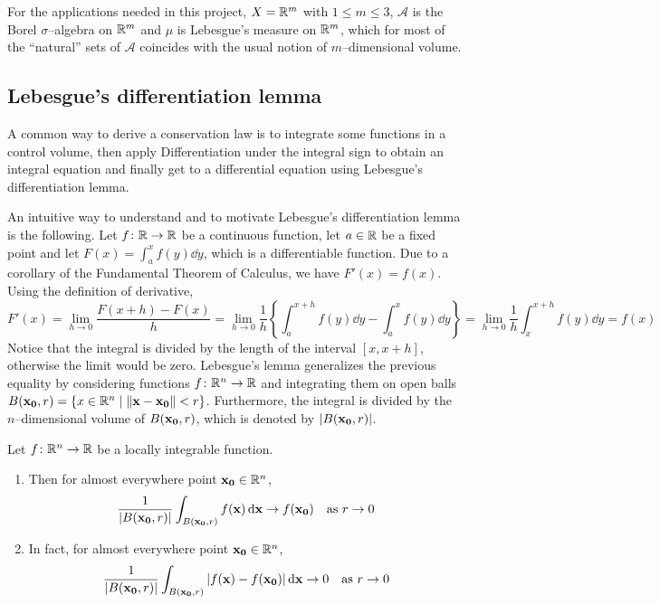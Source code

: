 For the applications needed in this project, $X = \mathbb{R}^m$ with $1 \leq m \leq 3$, $\mathcal{A}$ is the Borel $\sigma$--algebra on $\mathbb{R}^m$ and $\mu$ is Lebesgue's measure on $\mathbb{R}^m$, which for most of the ``natural'' sets of $\mathcal{A}$ coincides with the usual notion of $m$--dimensional volume.

\subsection{Lebesgue's differentiation lemma}

A common way to derive a conservation law is to integrate some functions in a control volume, then apply Differentiation under the integral sign to obtain an integral equation and finally get to a differential equation using Lebesgue's differentiation lemma. 

An intuitive way to understand and to motivate Lebesgue's differentiation lemma is the following. Let $f \colon \mathbb{R} \to \mathbb{R}$ be a continuous function, let $a \in \mathbb{R}$ be a fixed point and let $F(x) = \int_a^x f(y) \dd{y}$, which is a differentiable function. Due to a corollary of the Fundamental Theorem of Calculus, we have $F'(x) = f(x)$. Using the definition of derivative,
\[
	F'(x) = 
	\lim_{h \to 0} \frac{F(x + h) - F(x)}{h} = 
	\lim_{h \to 0} \frac{1}{h} \left\{ \int_a^{x + h} f(y) \dd{y} - \int_a^{x} f(y) \dd{y} \right\} = 
	\lim_{h \to 0} \frac{1}{h} \int_x^{x + h} f(y) \dd{y} = f(x)
\]
Notice that the integral is divided by the length of the interval $[x, x+h]$, otherwise the limit would be zero. Lebesgue's lemma generalizes the previous equality by considering functions $f \colon \mathbb{R}^n \to \mathbb{R}$ and integrating them on open balls $B(\vb{x_0}, r) = \{ x \in \mathbb{R}^n \mid \norm{\vb{x} - \vb{x_0}} < r\}$. Furthermore, the integral is divided by the $n$--dimensional volume of $B(\vb{x_0}, r)$, which is denoted by $\abs{B(\vb{x_0}, r)}$.

\begin{theorem} \label{eq:lebesgue_differentiation_lemma}
	Let $f \colon \mathbb{R}^n \rightarrow \mathbb{R}$ be a locally integrable function.
	\begin{enumerate}[label={(\arabic*)}, topsep=0pt]
		\item Then for almost everywhere point $\vb{x_0} \in \mathbb{R}^n$,
		\[
			\frac{1}{\abs{B(\vb{x_0}, r)}} \int_{B(\vb{x_0},r)} f(\vb{x}) \dd{\vb{x}} \to f(\vb{x_0}) 
			\quad \text{as } r \to 0
		\]
		\item In fact, for almost everywhere point $\vb{x_0} \in \mathbb{R}^n$,
		\[
			\frac{1}{\abs{B(\vb{x_0}, r)}} \int_{B(\vb{x_0},r)} \abs{f(\vb{x}) - f(\vb{x_0})} \dd{\vb{x}} \to 0 
			\quad \text{as } r \to 0
		\]		
	\end{enumerate}
\end{theorem}

